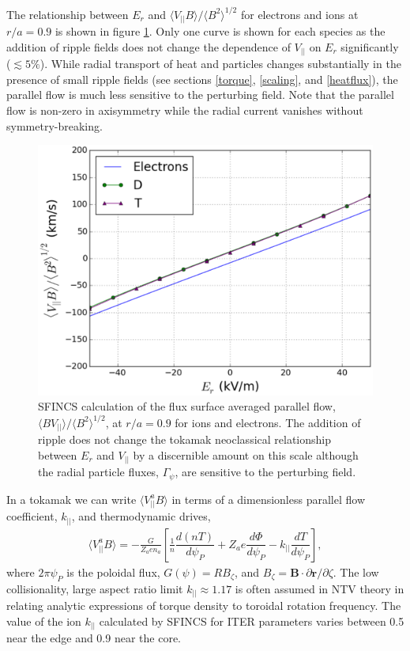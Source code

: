 \documentclass[aip, pop, preprint]{revtex4-1}
\newcommand{\der}[2]{\dfrac{d #1}{d  #2}}
\begin{document}
The relationship between $E_r$ and $\langle V_{||} B \rangle/\langle B^2 \rangle^{1/2}$ for electrons and ions at $r/a = 0.9$ is shown in figure \ref{fig:Er_flow}. Only one curve is shown for each species as the addition of ripple fields does not change the dependence of $V_{||}$ on $E_r$ significantly ($\lesssim 5 \%$). While radial transport of heat and particles changes substantially in the presence of small ripple fields (see sections \ref{torque}, \ref{scaling}, and \ref{heatflux}), the parallel flow is much less sensitive to the perturbing field. Note that the parallel flow is non-zero in axisymmetry while the radial current vanishes without symmetry-breaking. 

\begin{figure}[h!]
\centering
\includegraphics[width=.7\textwidth]{figure5.eps}
\caption{\label{fig:Er_flow} SFINCS calculation of the flux surface averaged parallel flow, $\langle B V_{||} \rangle/\langle B^2 \rangle^{1/2}$, at $r/a = 0.9$ for ions and electrons. The addition of ripple does not change the tokamak neoclassical relationship between $E_r$ and $V_{||}$ by a discernible amount on this scale although the radial particle fluxes, $\Gamma_{\psi}$, are sensitive to the perturbing field.}
\end{figure}

In a tokamak we can write $\langle V_{||}^a B \rangle$ in terms of a dimensionless parallel flow coefficient, $k_{||}$, and thermodynamic drives,
\begin{gather}
\langle  V_{||}^a  B\rangle = -\frac{G}{Z_a e n_a} \left[ \frac{1}{n} \der{(nT)}{\psi_P} + Z_a e \der{\Phi}{\psi_P} - k_{||} \der{T}{\psi_P} \right],
\end{gather}
where $2 \pi \psi_P$ is the poloidal flux, $G(\psi) = R B_{\zeta}$, and $B_{\zeta} = \bm{B} \cdot \partial \bm{r}/\partial \zeta$. The low collisionality, large aspect ratio limit \cite{Hinton1976, Hirshman1981} $k_{||} \approx 1.17$ is often assumed in NTV theory \cite{Callen2011, Sun2011} in relating analytic expressions of torque density to toroidal rotation frequency. The value of the ion $k_{||}$ calculated by SFINCS for ITER parameters varies between 0.5 near the edge and 0.9 near the core. 
\end{document}
